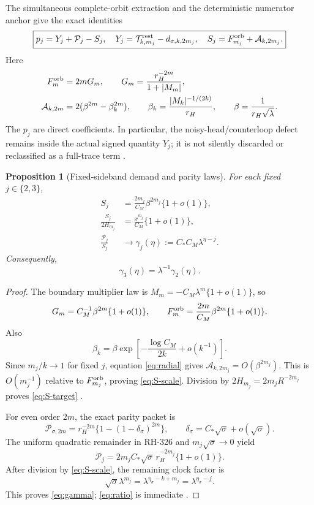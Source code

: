 \documentclass[11pt]{article}
\newtheorem{proposition}[theorem]{Proposition}
\theoremstyle{remark}
\newcommand{\cP}{\mathcal P}
\newcommand{\cA}{\mathcal A}
\newcommand{\cT}{\mathcal T}
\begin{document}
The simultaneous complete-orbit extraction and the deterministic numerator
anchor give the exact identities
\begin{equation}\label{eq:coefficient}
 \boxed{
 p_j=Y_j+\cP_j-S_j,
 \quad
 Y_j=\cT_{k,m_j}^{\rm rest}-d_{\sigma,k,2m_j},
 \quad
 S_j=F_{m_j}^{\rm orb}+\cA_{k,2m_j}.}
\end{equation}
Here
\begin{align}
 F_m^{\rm orb}&=2mG_m,\qquad
 G_m=\frac{r_H^{-2m}}{1+|M_m|},\label{eq:orbit}\\
 \cA_{k,2m}&=2(\beta^{2m}-\beta_k^{2m}),\qquad
 \beta_k=\frac{|M_k|^{-1/(2k)}}{r_H},
 \qquad \beta=\frac1{r_H\sqrt\lambda}.
 \label{eq:radial}
\end{align}
The $p_j$ are direct coefficients.  In particular, the noisy-head/counterloop
defect remains inside the actual signed quantity $Y_j$; it is not silently
discarded or reclassified as a full-trace term
\citep{WangFirstAlias2026,WangObservation2026}.

\begin{proposition}[Fixed-sideband demand and parity laws]
\label{prop:fixed-laws}
For each fixed $j\in\{2,3\}$,
\begin{align}
 S_j&=\frac{2m_j}{C_M}\beta^{2m_j}\{1+o(1)\},
 \label{eq:S-scale}\\
 \frac{S_j}{2H_{m_j}}
 &=\frac{x^{m_j}}{C_M}\{1+o(1)\},
 \label{eq:S-target}\\
 \frac{\cP_j}{S_j}
 &\longrightarrow\gamma_j(\eta)
 :=C_*C_M\lambda^{\eta-j}.
 \label{eq:gamma}
\end{align}
Consequently,
\begin{equation}\label{eq:ratio}
 \boxed{\gamma_3(\eta)=\lambda^{-1}\gamma_2(\eta).}
\end{equation}
\end{proposition}

\begin{proof}
The boundary multiplier law is
$M_m=-C_M\lambda^m\{1+o(1)\}$, so
\[
 G_m=C_M^{-1}\beta^{2m}\{1+o(1)\},\qquad
 F_m^{\rm orb}=\frac{2m}{C_M}\beta^{2m}\{1+o(1)\}.
\]
Also
\[
 \beta_k=\beta\exp\left[-\frac{\log C_M}{2k}+o(k^{-1})\right].
\]
Since $m_j/k\to1$ for fixed $j$, equation \eqref{eq:radial} gives
$\cA_{k,2m_j}=O(\beta^{2m_j})$.  This is $O(m_j^{-1})$ relative to
$F_{m_j}^{\rm orb}$, proving \eqref{eq:S-scale}.  Division by
$2H_{m_j}=2m_jR^{-2m_j}$ proves \eqref{eq:S-target}
\citep{WangBoundaryMonodromy2026,WangProjectorMass2026,
WangCompleteLower2026}.

For even order $2m$, the exact parity packet is
\begin{equation}\label{eq:parity-exact}
 \cP_{\sigma,2m}
 =r_H^{-2m}\{1-(1-\delta_\sigma)^{2m}\},
 \qquad
 \delta_\sigma=C_*\sqrt\sigma+o(\sqrt\sigma).
\end{equation}
The uniform quadratic remainder in RH-326 and
$m_j\sqrt\sigma\to0$ yield
\[
 \cP_j=2m_jC_*\sqrt\sigma\,r_H^{-2m_j}\{1+o(1)\}.
\]
After division by \eqref{eq:S-scale}, the remaining clock factor is
\[
 \sqrt\sigma\lambda^{m_j}
 =\lambda^{\eta_\sigma-k+m_j}
 =\lambda^{\eta_\sigma-j}.
\]
This proves \eqref{eq:gamma}; \eqref{eq:ratio} is immediate
\citep{WangParityBoundary2026,WangFirstAlias2026}.
\end{proof}
\end{document}
